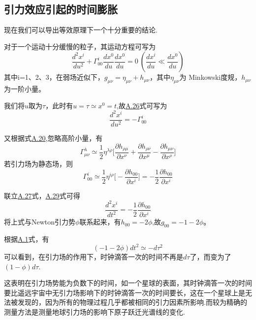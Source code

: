 \documentclass[a4paper]{book}
\begin{document}
\begin{appendix}
\section{引力效应引起的时间膨胀}
现在我们可以导出等效原理下一个十分重要的结论.\par
对于一个运动十分缓慢的粒子，其运动方程可写为
\begin{equation}\label{A.26}
\frac{d^2 x^{i}}{du^2}+\Gamma^{i}_{00}\frac{dx^{0}}{du}\frac{dx^{0}}{du}=0~(\frac{dx^i}{du}\ll \frac{dx^0}{du})
\end{equation}
其中i=1、2、3，在弱场近似下，$g_{\mu \nu}=\eta_{\mu \nu}+h_{\mu \nu}$，其中$\eta_{\mu \nu}$为 Minkowski度规，$h_{\mu \nu}$为一阶小量。\par 
我们将$u$取为$\tau$，此时有$u=\tau \simeq x^0=t$,故\hyperref[A.26]{A.26}式可写为
\begin{equation}\label{A.27}
	\frac{d^2 x^{i}}{du^2}=-\Gamma^{i}_{00}
\end{equation}\par 
又根据式\hyperref[A.20]{A.20},忽略高阶小量，有
\begin{equation}
	\Gamma^{\lambda}_{\mu \nu}\simeq\frac{1}{2} \eta^{\lambda \rho}\Big[\frac{\partial h_{\rho \mu}}{\partial x^{\nu}}+\frac{\partial h_{\rho \nu}}{\partial x^{\mu}}-\frac{\partial h_{\mu \nu}}{\partial x^{\rho}}\Big]
\end{equation}
若引力场为静态场，则
\begin{equation}\label{A.29}
		\Gamma^{i}_{00}\simeq\frac{1}{2} \eta^{i \rho}\Big[-\frac{\partial h_{00}}{\partial x^{i}}\Big]=-\frac{1}{2}\frac{\partial h_{00}}{\partial x^i}
\end{equation} \par
联立\hyperref[A.27]{A.27}式，\hyperref[A.29]{A.29}式可得
\begin{equation}
	\frac{d^2x^{i}}{dt^2}=-\frac{1}{2}\frac{\partial h_{00}}{\partial x^i}
\end{equation}
将上式与Newton引力势$\phi$联系起来，有$h_{00}=-2\phi$,故$g_{00}=-1-2\phi$。\par 
根据\hyperref[A.1]{A.1}式，有
\begin{equation}
	(-1-2\phi)dt^2\simeq-d\tau^2
\end{equation}
可以看到，在引力场的作用下，时钟滴答一次的时间不再是$d\tau$了，而变为了$(1-\phi)d\tau$.\par 
这表明在引力场势能为负数下的时间，如一个星球的表面，其时钟滴答一次的时间要比遥远宇宙中无引力场影响下的时钟滴答一次的时间要长，这在一个星球上是无法被发现的，因为所有的物理过程几乎都被相同的引力因素所影响.而较为精确的测量方法是测量地球引力场的影响下原子跃迁光谱线的变化.

\end{appendix}
\end{document}
